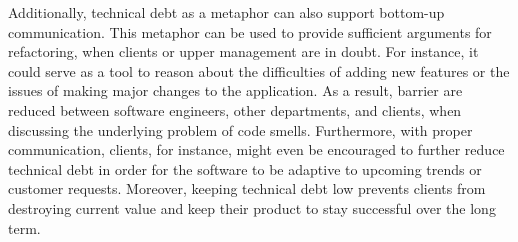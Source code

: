Additionally, technical debt as a metaphor 
	can also support bottom-up communication.
This metaphor can be used to provide sufficient arguments for refactoring, 
	when clients or upper management are in doubt.
For instance, it could serve as a tool to reason about 
	the difficulties of adding new features or 
	the issues of making major changes to the application. 
As a result, barrier are reduced between 
	software engineers, other departments, and clients, when discussing the 
	underlying problem of code smells. 
Furthermore, with proper communication, 
	clients, for instance, might even be encouraged to further reduce 
	technical debt in order for the software to be adaptive to 
	upcoming trends or customer requests. 
Moreover, keeping technical debt low prevents clients from destroying current value 
	and keep their product to stay successful over the long term.
